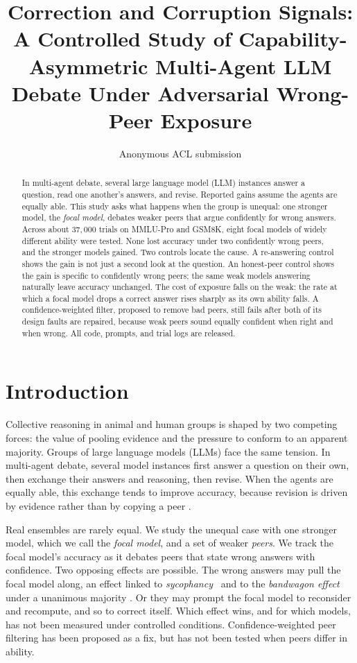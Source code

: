 \documentclass[11pt]{article}
\title{Correction and Corruption Signals: A Controlled Study of
Capability-Asymmetric Multi-Agent LLM Debate Under Adversarial
Wrong-Peer Exposure}
\author{Anonymous ACL submission}
\begin{document}
\maketitle

\begin{abstract}
In multi-agent debate, several large language model (LLM) instances
answer a question, read one another's answers, and revise.
Reported gains assume the agents are equally able.
This study asks what happens when the group is unequal: one stronger
model, the \textit{focal model}, debates weaker peers that argue
confidently for wrong answers.
Across about $37{,}000$ trials on MMLU-Pro and GSM8K, eight focal
models of widely different ability were tested.
None lost accuracy under two confidently wrong peers, and the stronger
models gained.
Two controls locate the cause.
A re-answering control shows the gain is not just a second look at the
question.
An honest-peer control shows the gain is specific to confidently wrong
peers; the same weak models answering naturally leave accuracy
unchanged.
The cost of exposure falls on the weak: the rate at which a focal model
drops a correct answer rises sharply as its own ability falls.
A confidence-weighted filter, proposed to remove bad peers, still fails
after both of its design faults are repaired, because weak peers sound
equally confident when right and when wrong.
All code, prompts, and trial logs are released.
\end{abstract}

\section{Introduction}
\label{sec:intro}

Collective reasoning in animal and human groups is shaped by two competing
forces: the value of pooling evidence and the pressure to conform to an
apparent majority.
Groups of large language models (LLMs) face the same tension.
In multi-agent debate, several model instances first answer a question on
their own, then exchange their answers and reasoning, then revise.
When the agents are equally able, this exchange tends to improve accuracy,
because revision is driven by evidence rather than by copying a peer
\citep{du2023improving}.

Real ensembles are rarely equal.
We study the unequal case with one stronger model, which we call the
\textit{focal model}, and a set of weaker \textit{peers}.
We track the focal model's accuracy as it debates peers that state wrong
answers with confidence.
Two opposing effects are possible.
The wrong answers may pull the focal model along, an effect linked to
\textit{sycophancy}~\citep{sharma2023towards} and to the
\textit{bandwagon effect} under a unanimous majority
\citep{asch1951effects,koo2024benchmarking}.
Or they may prompt the focal model to reconsider and recompute, and so to
correct itself.
Which effect wins, and for which models, has not been measured under
controlled conditions.
Confidence-weighted peer filtering has been proposed as a fix, but has not
been tested when peers differ in ability.
\end{document}
